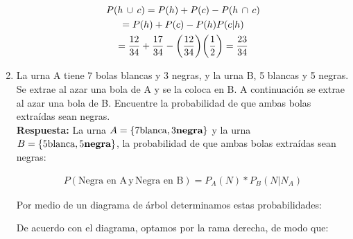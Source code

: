 \documentclass[12pt]{article}
\begin{document}
\begin{enumerate}
   \begin{gather}
       P(h\, \cup\, c) = P(h) + P(c) - P(h \, \cap \, c)\\
       = P(h) + P(c) - P(h)P(c|h)\\
       = \frac{12}{34} + \frac{17}{34} - \qty(\frac{12}{34})\qty(\frac{1}{2}) =\frac{23}{34}
   \end{gather}
   
   \begin{center}
    \end{center}
    
    \item La urna A tiene 7 bolas blancas y 3 negras, y la urna B, 5 blancas y 5 negras. Se extrae al azar una bola de A y se la coloca en B. A continuación se extrae al azar una bola de B. Encuentre la probabilidad de que ambas bolas extraídas sean negras.\\
    
    \textbf{Respuesta:}
    La urna $A=\qty{7\text{blanca}, 3\textbf{negra}}$ y la urna $B=\qty{5\text{blanca}, 5\textbf{negra}}$, la probabilidad de que ambas bolas extraídas sean negras:
    
    \begin{gather}
        P(\text{Negra en A}\, \text{y} \, \text{Negra en B}) = P_A(N)*P_B(N|N_A)
    \end{gather}
    
    Por medio de un diagrama de árbol determinamos estas probabilidades:
    
       \begin{center}
    \end{center}
    De acuerdo con el diagrama, optamos por la rama derecha, de modo que:
    

\end{enumerate}
\end{document}
